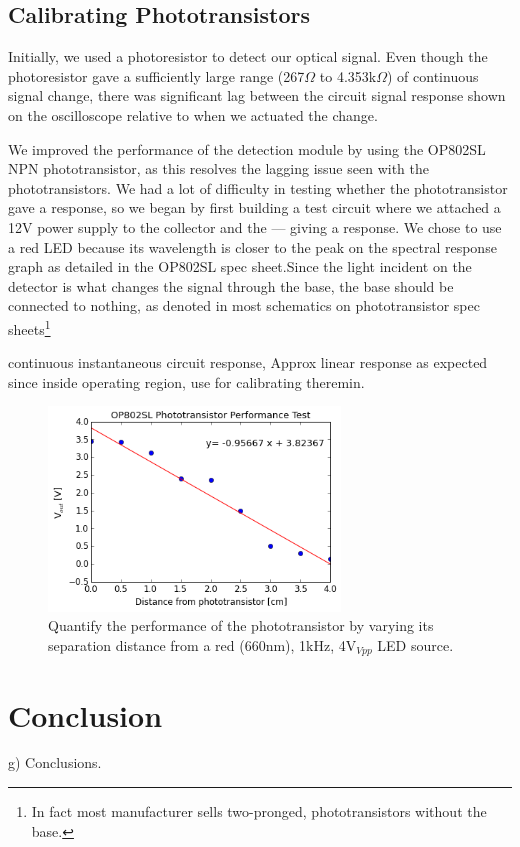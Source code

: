 \documentclass[twocolumn]{article}
\begin{document}
\subsection{Calibrating Phototransistors}
\par Initially, we used a photoresistor to detect our optical signal. Even though the photoresistor gave a sufficiently large range (267$\Omega$ to 4.353k$\Omega$) of continuous signal change, there was significant lag between the circuit signal response shown on the oscilloscope relative to when we actuated the change. 
\par We improved the performance of the detection module by using the OP802SL NPN phototransistor, as this resolves the lagging issue seen with the phototransistors. We had a lot of difficulty in testing whether the phototransistor gave a response, so we began by first building a test circuit where we attached a 12V power supply to the collector and the --- giving a response.  We chose to use a red LED because its wavelength is closer to the peak on the spectral response graph as detailed in the OP802SL spec sheet.Since the light incident on the detector is what changes the signal through the base, the base should be connected to nothing, as denoted in most schematics on phototransistor spec sheets\footnote{In fact most manufacturer sells two-pronged, phototransistors without the base.}
\par  continuous instantaneous circuit response,
Approx linear response as expected since inside operating region, use for calibrating theremin. 
\begin{figure}[h!]
 \centering
 \includegraphics[width=220pt]{figure/phototransistor_performance}
\caption{Quantify the performance of the phototransistor by varying its separation distance from a red (660nm), 1kHz, 4V$_{Vpp}$ LED source.}
\label{phototransistor_performance}
\end{figure}
\section{Conclusion}
g)              Conclusions.
\end{document}

